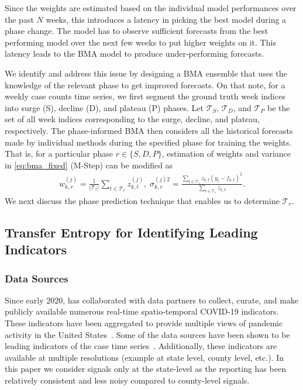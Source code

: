 \documentclass[conference,compsoc]{IEEEtran}
\begin{document}
  Since the weights are estimated based on the individual model performances over the past $N$ weeks, this introduces a latency in picking the best model during a phase change. The model has to observe sufficient forecasts from the best performing model over the next few weeks to put higher weights on it. This latency leads to the BMA model to produce under-performing forecasts.
 
We identify and address this issue by designing a BMA ensemble that uses the knowledge of the relevant phase to get improved forecasts. On that note, for a weekly case counts time series, we first segment the ground truth week indices into surge (S), decline (D), and plateau (P) phases. Let $\mathcal{T}_S$, $\mathcal{T}_D$, and $\mathcal{T}_P$ be the set of all week indices corresponding to the surge, decline, and plateau, respectively. The phase-informed BMA then considers all the historical forecasts made by individual methods during the specified phase for training the weights. That is, for a particular phase $r \in \{S,D,P\}$, estimation of weights and variance in \eqref{eq:bma_fixed} (M-Step) can be modified as
\begin{eqnarray}
    w^{(j)}_{k,r} = \frac{1}{|\mathcal{T}_r|} \sum_{t \in \mathcal{T}_r} z_{k,t}^{(j)}, \;
    \sigma^{(j)2}_{k,r} = \frac{\sum_{t \in \mathcal{T}_r}z_{k,t}(y_t-f_{k,t})^2}{\sum_{t \in \mathcal{T}_r}z_{k,t}  }.
\end{eqnarray}
We next discuss the phase prediction technique that enables us to determine $\mathcal{T}_r$.
\subsection{Transfer Entropy for Identifying Leading Indicators} \label{subsec:phase.pred}

\subsubsection{Data Sources} \label{sec:data-src}
Since early 2020, \cite{covidcast} has collaborated with data partners to collect, curate, and make publicly available numerous real-time spatio-temporal COVID-19 indicators. These indicators have been aggregated to provide multiple views of pandemic activity in the United States~\cite{reinhart2021open}. Some of the data sources have been shown to be leading indicators of the case time series~\cite{mcdonald2021can}. Additionally, these indicators are available at multiple resolutions (example at state level, county level, etc.). In this paper we consider signals only at the state-level as the reporting has been relatively consistent and less noisy compared to county-level signals.
\end{document}
